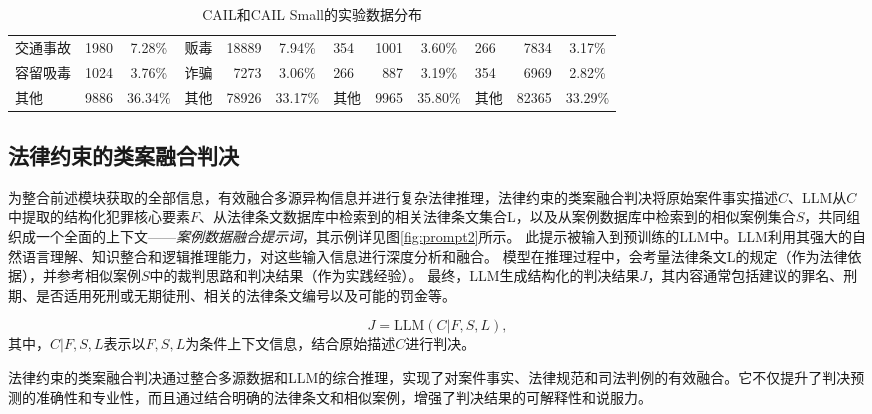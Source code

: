 \begin{table}[!htbp]
\begin{tabular}{lrc|lrc|lrc|lrc}
		交通事故                             & 1980                               & 7.28\%                           & 贩毒                        & 18889       & 7.94\%      & 354         & 1001        & 3.60\%      & 266         & 7834        & 3.17\%      \\
		容留吸毒                             & 1024                               & 3.76\%                           & 诈骗                        & 7273        & 3.06\%      & 266         & 887         & 3.19\%      & 354         & 6969        & 2.82\%      \\
		其他                               & 9886                               & 36.34\%                          & 其他                        & 78926       & 33.17\%     & 其他          & 9965        & 35.80\%     & 其他          & 82365       & 33.29\%     \\
		\hline
	\end{tabular}
	\caption{CAIL和CAIL Small的实验数据分布}
	\label{tab:cail}
\end{table}



\subsection{\heiti 法律约束的类案融合判决}
为整合前述模块获取的全部信息，有效融合多源异构信息并进行复杂法律推理，法律约束的类案融合判决将原始案件事实描述$C$、LLM从$C$中提取的结构化犯罪核心要素$F$、从法律条文数据库中检索到的相关法律条文集合L，以及从案例数据库中检索到的相似案例集合$S$，共同组织成一个全面的上下文——\textit{案例数据融合提示词}，其示例详见图\ref{fig:prompt2}所示。
此提示被输入到预训练的LLM中。LLM利用其强大的自然语言理解、知识整合和逻辑推理能力，对这些输入信息进行深度分析和融合。
模型在推理过程中，会考量法律条文L的规定（作为法律依据），并参考相似案例$S$中的裁判思路和判决结果（作为实践经验）。
最终，LLM生成结构化的判决结果$J$，其内容通常包括建议的罪名、刑期、是否适用死刑或无期徒刑、相关的法律条文编号以及可能的罚金等。

\begin{equation}
	J=\text{LLM}(C|F,S,L),
\end{equation}
其中，$C | F,S,L $表示以$F,S,L$为条件上下文信息，结合原始描述$C$进行判决。

法律约束的类案融合判决通过整合多源数据和LLM的综合推理，实现了对案件事实、法律规范和司法判例的有效融合。它不仅提升了判决预测的准确性和专业性，而且通过结合明确的法律条文和相似案例，增强了判决结果的可解释性和说服力。


